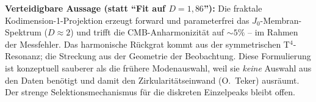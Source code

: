 \textbf{Verteidigbare Aussage (statt ``Fit auf $D=1{,}86$''):} Die
fraktale Kodimension-1-Projektion erzeugt forward und parameterfrei das
$J_0$-Membran-Spektrum ($D\approx2$) und trifft die CMB-Anharmonizität auf
$\sim5\%$ -- im Rahmen der Messfehler. Das harmonische Rückgrat kommt aus
der symmetrischen T$^4$-Resonanz; die Streckung aus der Geometrie der
Beobachtung. Diese Formulierung ist konzeptuell sauberer als die frühere
Modenauswahl, weil sie \emph{keine} Auswahl aus den Daten benötigt und
damit den Zirkularitätseinwand (O.~Teker) ausräumt. Der strenge
Selektionsmechanismus für die diskreten Einzelpeaks bleibt offen.
